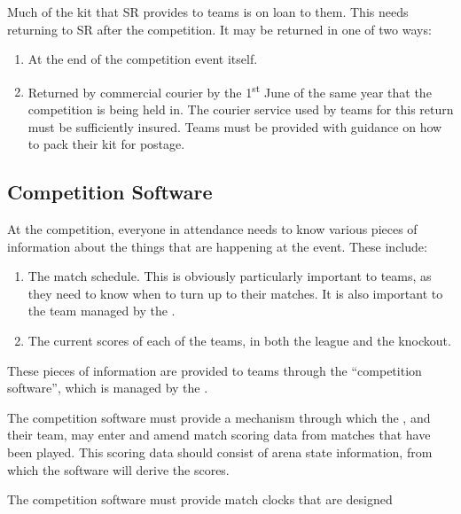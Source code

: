 Much of the kit that SR provides to teams is on loan to them.  This needs returning to SR after the competition.  It may be returned in one of two ways:

\begin{enumerate}
\item At the end of the competition event itself.
\item Returned by commercial courier by the 1\textsuperscript{st} June of the same year that the competition is being held in.  The courier service used by teams for this return must be sufficiently insured.  Teams must be provided with guidance on how to pack their kit for postage.
\end{enumerate}

\subsection{Competition Software}

At the competition, everyone in attendance needs to know various pieces of information about the things that are happening at the event.  These include:
\begin{enumerate}
\item The match schedule.  This is obviously particularly important to teams, as they need to know when to turn up to their matches.  It is also important to the team managed by the .
\item The current scores of each of the teams, in both the league and the knockout.
\end{enumerate}
These pieces of information are provided to teams through the ``competition software'', which is managed by the .

The competition software must provide a mechanism through which the , and their team, may enter and amend match scoring data from matches that have been played.  This scoring data should consist of arena state information, from which the software will derive the scores.

The competition software must provide match clocks that are designed 

